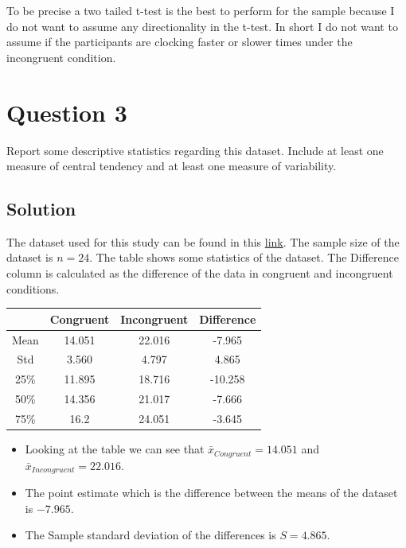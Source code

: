 \documentclass[12pt]{article}%
\begin{document}
To be precise a two tailed t-test is the best to perform for the sample because I do not want to assume any directionality in the t-test. In short I do not want to assume if the participants are clocking faster or slower times under the incongruent condition. 


\section*{Question 3}

Report some descriptive statistics regarding this dataset. Include at least one measure of central tendency and at least one measure of variability.

\subsection*{Solution}

The dataset used for this study can be found in this \href{https://drive.google.com/file/d/0B9Yf01UaIbUgQXpYb2NhZ29yX1U/view}{link}. The sample size of the dataset is $n=24$. The table shows some statistics of the dataset. The Difference column is calculated as the difference of the data in congruent and incongruent conditions.

\begin{center}
 \begin{tabular}{||c c c c||} 
 \hline
   & Congruent & Incongruent & Difference \\ [0.5ex] 
 \hline\hline
 Mean & 14.051 & 22.016 &  -7.965  \\ 
 \hline
 Std & 3.560  &   4.797 &  4.865 \\
 \hline
 25\% & 11.895  &  18.716 & -10.258 \\
 \hline
 50\% & 14.356  &  21.017 &  -7.666 \\
 \hline
 75\% & 16.2 &   24.051  & -3.645 \\ [1ex] 
 \hline
\end{tabular}
\end{center}

 \begin{itemize}
   \item Looking at the table we can see that $\bar{x}_{Congruent} = 14.051$ and $\bar{x}_{Incongruent} = 22.016$.
   \item The point estimate which is the difference between the means of the dataset is  $-7.965$. 
   \item The Sample standard deviation of the differences is $S = 4.865$.
 \end{itemize}
\end{document}
